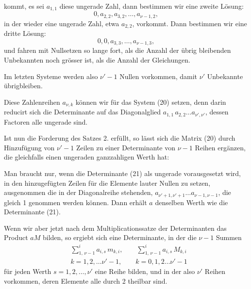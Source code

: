 
kommt, es sei $a_{1,1}$ diese ungerade Zahl, dann bestimmen wir
eine zweite Lösung:
\[
0, a_{2,2}, a_{3,2}, \ldots, a_{\nu-1,2},
\]
in der wieder eine ungerade Zahl, etwa $a_{2,2}$, vorkommt. Dann
bestimmen wir eine dritte Lösung:
\[
0, 0, a_{3,3}, \ldots, a_{\nu-1,3},
\]
und fahren mit Nullsetzen so lange fort, als die Anzahl der
übrig bleibenden Unbekannten noch grösser ist, als die Anzahl
der Gleichungen.

Im letzten Systeme werden also $\nu'-1$ Nullen vorkommen,
damit $\nu'$ Unbekannte übrigbleiben.

Diese Zahlenreihen $a_{\nu,k}$ können wir für das System (20)
setzen, denn darin reducirt sich die Determinante
auf das Diagonalglied $a_{1,1}\, a_{2,2} \ldots a_{\nu',\nu'}$, dessen Factoren alle ungerade
 sind.

Ist nun die Forderung des Satzes 2. erfüllt, so lässt sich
die Matrix (20) durch Hinzufügung von $\nu'-1$ Zeilen zu einer
Determinante von $\nu-1$ Reihen ergänzen, die gleichfalls einen
ungeraden ganzzahligen Werth hat:

Man braucht nur, wenn die Determinante (21) als ungerade
vorausgesetzt wird, in den hinzugefügten Zeilen für die Elemente
lauter Nullen zu setzen, ausgenommen die in der Diagonalreihe
 stehenden, $a_{\nu'+1,\nu'+1} \ldots a_{\nu-1,\nu-1}$, die gleich 1 genommen
werden können. Dann erhält $a$ denselben Werth wie die Determinante
 (21).

Wenn wir aber jetzt nach dem Multiplicationssatze der
Determinanten das Product $a M$ bilden, so ergiebt sich eine
Determinante, in der die $\nu-1$ Summen
\[
\begin{aligned}
& \sum\limits_{1,\, \nu-1}^{i} a_{i,s}\, m_{k,i}, \qquad \sum\limits_{1,\, \nu-1}^{i} a_{i,s}\, M_{k,i} \\
& k = 1, 2, \ldots \nu'-1, \qquad k = 0, 1, 2 \ldots \nu'-1
\end{aligned}
\]
für jeden Werth $s = 1, 2, \ldots, \nu'$ eine Reihe bilden, und in der
also $\nu'$ Reihen vorkommen, deren Elemente alle durch 2 theilbar
 sind.

